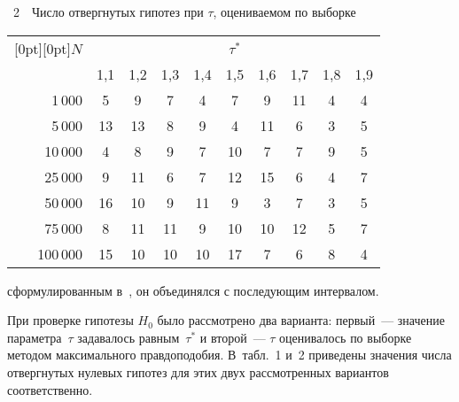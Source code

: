 \begin{multicols}{2}
\noindent
{{\tablename~2}\ \ \small{Число отвергнутых гипотез при $\tau$, оцени\-ва\-емом
по выборке}}
\vspace*{1.5ex}

{\small 
\tabcolsep=4.5pt
\begin{center}
\begin{tabular}{|r|c|c|c|c|c|c|c|c|c|}
\hline
\multicolumn{1}{|c|}{\raisebox{-6pt}[0pt][0pt]{$N$}} &\multicolumn{9}{c|}{$\tau^*$}\\
\cline{2-10}
& 1,1 & 1,2 & 1,3 & 1,4 & 1,5 & 1,6 & 1,7 & 1,8 & 1,9 \\ 
\hline
1\,000 & \hphantom{9}5 & \hphantom{9}9 & \hphantom{9}7 & \hphantom{9}4 & \hphantom{9}7 & \hphantom{9}9 & 11 & \hphantom{9}4 & \hphantom{9}4 \\
5\,000 & 13 & 13 & \hphantom{9}8 & \hphantom{9}9 & \hphantom{9}4 & 11 & \hphantom{9}6 & \hphantom{9}3 & \hphantom{9}5 \\
10\,000 &\hphantom{9}4 & \hphantom{9}8 & \hphantom{9}9 & \hphantom{9}7 & 10 & \hphantom{9}7 & \hphantom{9}7 & \hphantom{9}9 & \hphantom{9}5 \\
25\,000 &\hphantom{9}9 & 11 & \hphantom{9}6 & \hphantom{9}7 & 12 & 15 & \hphantom{9}6 & \hphantom{9}4 & \hphantom{9}7 \\
50\,000 &16 &10 & \hphantom{9}9 & 11 & \hphantom{9}9 & \hphantom{9}3 & \hphantom{9}7 & \hphantom{9}3 & \hphantom{9}5 \\
75\,000 &\hphantom{9}8 & 11 & 11 & \hphantom{9}9 & 10 & 10 & 12 & \hphantom{9}5 & \hphantom{9}7 \\
100\,000 &15 & 10 & 10 & 10 & 17 & \hphantom{9}7 & \hphantom{9}6 & \hphantom{9}8 & \hphantom{9}4 \\ 
\hline
\end{tabular}
\end{center}}

\vspace*{18pt}

\addtocounter{table}{2}

\noindent
сформулированным в~\cite{Aivaz}, он
объединялся с последующим интервалом. 

При проверке гипотезы $H_0$
было рассмотрено два варианта: первый~--- значение параметра~$\tau$ 
задавалось равным~$\tau^*$ и второй~--- $\tau$ оценивалось
по выборке методом максимального правдоподобия. В~табл.~1 и~2
приведены значения числа отвергнутых нулевых гипотез для этих
двух рассмотренных вариантов соответственно.



\end{multicols}
